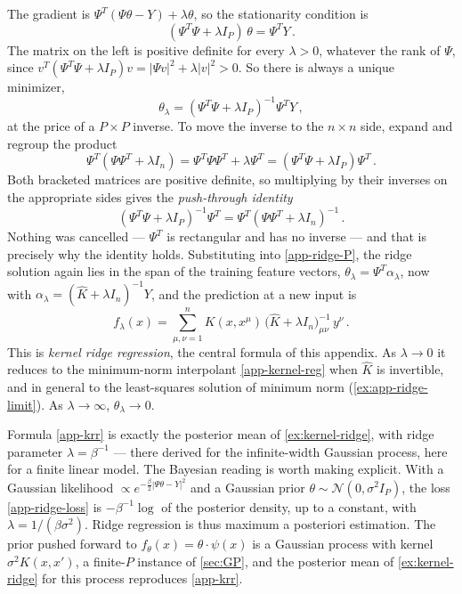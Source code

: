 \documentclass[11pt]{article}
\newcommand{\CN}{{\mathcal N}}
\begin{document}
The gradient is $\Psi^T(\Psi\theta - Y) + \lambda\theta$, so the stationarity condition is
%
\begin{equation}
    (\Psi^T\Psi + \lambda I_P)\,\theta = \Psi^TY\,. \label{app-ridge-normal}
\end{equation}
%
The matrix on the left is positive definite for every $\lambda>0$, whatever the rank of $\Psi$, since $v^T(\Psi^T\Psi+\lambda I_P)v = |\Psi v|^2+\lambda|v|^2>0$. So there is always a unique minimizer,
%
\begin{equation}
    \theta_\lambda = (\Psi^T\Psi + \lambda I_P)^{-1}\Psi^TY\,, \label{app-ridge-P}
\end{equation}
%
at the price of a $P\times P$ inverse. To move the inverse to the $n\times n$ side, expand and regroup the product
%
\begin{equation}
    \Psi^T(\Psi\Psi^T + \lambda I_n) = \Psi^T\Psi\Psi^T + \lambda\Psi^T = (\Psi^T\Psi + \lambda I_P)\Psi^T\,.
\end{equation}
%
Both bracketed matrices are positive definite, so multiplying by their inverses on the appropriate sides gives the \emph{push-through identity}
%
\begin{equation}
    (\Psi^T\Psi + \lambda I_P)^{-1}\Psi^T = \Psi^T(\Psi\Psi^T + \lambda I_n)^{-1}\,. \label{app-pushthrough}
\end{equation}
%
Nothing was cancelled --- $\Psi^T$ is rectangular and has no inverse --- and that is precisely why the identity holds. Substituting into \eqref{app-ridge-P}, the ridge solution again lies in the span of the training feature vectors, $\theta_\lambda = \Psi^T\alpha_\lambda$, now with $\alpha_\lambda = (\hat K+\lambda I_n)^{-1}Y$, and the prediction at a new input is
%
\begin{equation}
    f_\lambda(x) = \sum_{\mu,\nu=1}^n K(x,x^\mu)\,\big(\hat K + \lambda I_n\big)^{-1}_{\mu\nu}\,y^\nu\,. \label{app-krr}
\end{equation}
%
This is \emph{kernel ridge regression}, the central formula of this appendix. As $\lambda\to 0$ it reduces to the minimum-norm interpolant \eqref{app-kernel-reg} when $\hat K$ is invertible, and in general to the least-squares solution of minimum norm (\cref{ex:app-ridge-limit}). As $\lambda\to\infty$, $\theta_\lambda\to 0$.

Formula \eqref{app-krr} is exactly the posterior mean of \cref{ex:kernel-ridge}, with ridge parameter $\lambda = \beta^{-1}$ --- there derived for the infinite-width Gaussian process, here for a finite linear model. The Bayesian reading is worth making explicit. With a Gaussian likelihood $\propto e^{-\frac{\beta}{2}|\Psi\theta-Y|^2}$ and a Gaussian prior $\theta\sim\CN(0,\sigma^2 I_P)$, the loss \eqref{app-ridge-loss} is $-\beta^{-1}\log$ of the posterior density, up to a constant, with $\lambda = 1/(\beta\sigma^2)$. Ridge regression is thus maximum a posteriori estimation. The prior pushed forward to $f_\theta(x) = \theta\cdot\psi(x)$ is a Gaussian process with kernel $\sigma^2K(x,x')$, a finite-$P$ instance of \cref{sec:GP}, and the posterior mean of \cref{ex:kernel-ridge} for this process reproduces \eqref{app-krr}.
\end{document}
